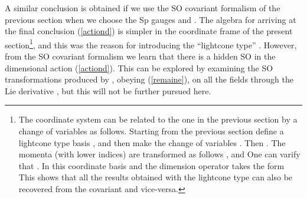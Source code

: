 \documentclass[a4paper,12pt]{article}
\begin{document}
A similar conclusion is obtained if we use the SO\coordHE{}
covariant formalism of the previous section when we choose the Sp\myHighlight{$\left(
2\right) $}\coordHE{} gauges \coordHE{} and \coordHE{}. The algebra for arriving at the final conclusion (\ref{actiond}) is
simpler in the coordinate frame of the present section\footnote{%
The \coordHE{} coordinate system can be related to
the one in the previous section by a change of variables as follows.
Starting from the previous section define a lightcone type basis \coordHE{}, and
then make the change of variables \coordHE{}  \coordHE{}  \coordHE{}. Then \coordHE{}. The momenta
(with lower indices) are transformed as follows \coordHE{}  \coordHE{}, and \coordHE{} One can varify that \coordHE{}. In
this coordinate basis \coordHE{} and the dimension
operator \coordHE{} takes the form \coordHE{} This shows that all the results obtained with
the lightcone type \coordHE{} can also be recovered from the covariant \coordHE{} and vice-versa.}, and this was the reason for
introducing the ``lightcone type'' \coordHE{}. However, from the SO\coordHE{} covariant formalism we learn that there is a hidden SO\coordHE{} in the \coordHE{} dimensional action (\ref{actiond}). This can
be explored by examining the SO\coordHE{} transformations produced
by \coordHE{}, obeying (\ref{remaine}), on all
the fields through the Lie derivative \coordHE{}, \coordHE{} but this
will not be further pursued here.
\end{document}
